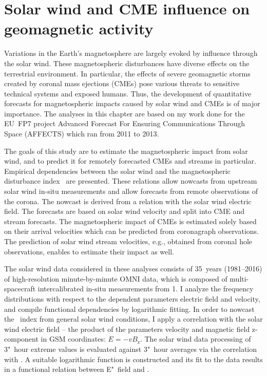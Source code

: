 
\chapter{Solar wind and CME influence on geomagnetic activity}
\label{chap:chapter2}

Variations in the Earth's magnetosphere are largely evoked by influence through the solar wind. These magnetospheric disturbances have diverse effects on the terrestrial environment. In particular, the effects of severe geomagnetic storms created by coronal mass ejections (CMEs) pose various threats to sensitive technical systems and exposed humans. Thus, the development of quantitative forecasts for magnetospheric impacts caused by solar wind and CMEs is of major importance.
The analyses in this chapter are based on my work done for the EU~FP7 project Advanced Forecast For Ensuring Communications Through Space (AFFECTS) which ran from 2011 to 2013.

The goals of this study are to estimate the magnetospheric impact from solar wind, and to predict it for remotely forecasted CMEs and streams in particular. Empirical dependencies between the solar wind and the magnetospheric disturbance index~\Kp{} are presented. These relations allow nowcasts from upstream solar wind in-situ measurements and allow forecasts from remote observations of the corona. The \Kp{} nowcast is derived from a relation with the solar wind electric field. The \Kp{} forecasts are based on solar wind velocity and split into CME and stream forecasts. The magnetospheric impact of CMEs is estimated solely based on their arrival velocities which can be predicted from coronagraph observations. The prediction of solar wind stream velocities, e.g., obtained from coronal hole observations, enables to estimate their impact as well.

The solar wind data considered in these analyses consists of 35~years (1981--2016) of high-resolution minute-by-minute OMNI data, which is composed of multi-spacecraft intercalibrated in-situ measurements from \SI{1}{\au}. I analyze the \Kp{} frequency distributions with respect to the dependent parameters electric field and velocity, and compile functional dependencies by logarithmic fitting.
In order to nowcast the \Kp~index from general solar wind conditions, I apply a correlation with the solar wind electric field -- the product of the parameters velocity and magnetic field z-component in GSM coordinates: $E = - v B_\text{z}$. The solar wind data processing of 3"~hour extreme values is evaluated against 3"~hour averages via the correlation with \Kp{}. A suitable logarithmic function is constructed and its fit to the data results in a functional relation between E"~field and \Kp{}.

